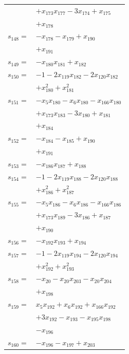 \begin{longtable}{@{}r@{\;}l@{}}
 & \(\displaystyle +x_{173}x_{177} -3x_{174} +x_{175}\) \\
 & \(\displaystyle +x_{178}\) \\[3pt]
\(s_{148}=\) & \(\displaystyle -x_{178} -x_{179} +x_{190}\) \\
 & \(\displaystyle +x_{191}\) \\[3pt]
\(s_{149}=\) & \(\displaystyle -x_{180}x_{181} +x_{182}\) \\[3pt]
\(s_{150}=\) & \(\displaystyle -1 -2x_{119}x_{182} -2x_{120}x_{182}\) \\
 & \(\displaystyle +x_{180}^{2} +x_{181}^{2}\) \\[3pt]
\(s_{151}=\) & \(\displaystyle -x_{5}x_{180} -x_{6}x_{180} -x_{166}x_{180}\) \\
 & \(\displaystyle +x_{173}x_{183} -3x_{180} +x_{181}\) \\
 & \(\displaystyle +x_{184}\) \\[3pt]
\(s_{152}=\) & \(\displaystyle -x_{184} -x_{185} +x_{190}\) \\
 & \(\displaystyle +x_{191}\) \\[3pt]
\(s_{153}=\) & \(\displaystyle -x_{186}x_{187} +x_{188}\) \\[3pt]
\(s_{154}=\) & \(\displaystyle -1 -2x_{119}x_{188} -2x_{120}x_{188}\) \\
 & \(\displaystyle +x_{186}^{2} +x_{187}^{2}\) \\[3pt]
\(s_{155}=\) & \(\displaystyle -x_{5}x_{186} -x_{6}x_{186} -x_{166}x_{186}\) \\
 & \(\displaystyle +x_{173}x_{189} -3x_{186} +x_{187}\) \\
 & \(\displaystyle +x_{190}\) \\[3pt]
\(s_{156}=\) & \(\displaystyle -x_{192}x_{193} +x_{194}\) \\[3pt]
\(s_{157}=\) & \(\displaystyle -1 -2x_{119}x_{194} -2x_{120}x_{194}\) \\
 & \(\displaystyle +x_{192}^{2} +x_{193}^{2}\) \\[3pt]
\(s_{158}=\) & \(\displaystyle -x_{20} -x_{20}x_{203} -x_{20}x_{204}\) \\
 & \(\displaystyle +x_{198}\) \\[3pt]
\(s_{159}=\) & \(\displaystyle x_{5}x_{192} +x_{6}x_{192} +x_{166}x_{192}\) \\
 & \(\displaystyle +3x_{192} -x_{193} -x_{195}x_{198}\) \\
 & \(\displaystyle -x_{196}\) \\[3pt]
\(s_{160}=\) & \(\displaystyle -x_{196} -x_{197} +x_{203}\) \\

\end{longtable}
